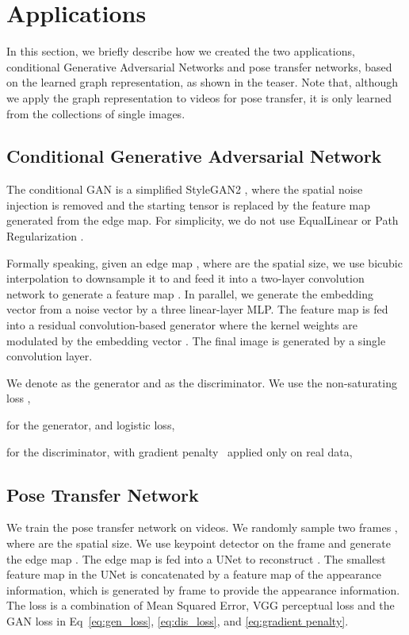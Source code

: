 \documentclass{article}
\begin{document}
\section{Applications}
In this section, we briefly describe how we created the two applications, conditional Generative Adversarial Networks and pose transfer networks, based on the learned graph representation, as shown in the teaser. Note that, although we apply the graph representation to videos for pose transfer, it is only learned from the collections of single images.

\subsection{Conditional Generative Adversarial Network}
The conditional GAN is a simplified StyleGAN2 \cite{karras2020analyzing}, where the spatial noise injection is removed and the starting tensor is replaced by the feature map generated from the edge map. For simplicity, we do not use EqualLinear \cite{karras2019style} or Path Regularization \cite{karras2019style}.

Formally speaking, given an edge map , where  are the spatial size, we use bicubic interpolation to downsample it to  and feed it into a two-layer convolution network to generate a feature map . In parallel, we generate the embedding vector  from a noise vector  by a three linear-layer MLP. The feature map  is fed into a residual convolution-based generator where the kernel weights are modulated by the embedding vector  \cite{karras2020analyzing}. The final image  is generated by a single convolution layer.

We denote  as the generator and  as the discriminator. We use the non-saturating loss \cite{goodfellow2014generative},

for the generator, and logistic loss,

for the discriminator, with gradient penalty~\cite{mescheder2018training} applied only on real data,


\subsection{Pose Transfer Network}
We train the pose transfer network on videos. We randomly sample two frames , where  are the spatial size. We use keypoint detector on the frame  and generate the edge map . The edge map is fed into a UNet \cite{ronneberger2015u} to reconstruct . The smallest feature map in the UNet is concatenated by a feature map of the appearance information, which is generated by frame  to provide the appearance information. The loss is a combination of Mean Squared Error, VGG perceptual loss \cite{johnson2016perceptual} and the GAN loss in Eq~\ref{eq:gen_loss}, \ref{eq:dis_loss}, and \ref{eq:gradient penalty}.
\end{document}
